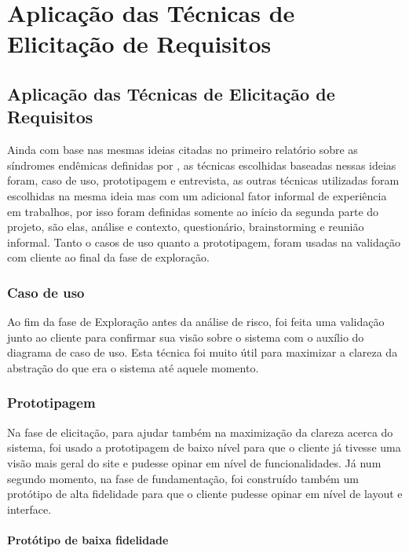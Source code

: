 \part{Aplicação das Técnicas de Elicitação de Requisitos}
\chapter[Aplicação das Técnicas de Elicitação de Requisitos]{Aplicação das Técnicas de Elicitação de Requisitos} \label{sec:tec}


Ainda com base nas mesmas ideias citadas no primeiro relatório sobre as síndromes endêmicas definidas por \cite{leffingwell2000managing}, as técnicas escolhidas baseadas nessas ideias foram, caso de uso, prototipagem e entrevista, as outras técnicas utilizadas foram escolhidas na mesma ideia mas com um adicional fator informal de experiência em trabalhos, por isso foram definidas somente ao início da segunda parte do projeto, são elas, análise e contexto, questionário, brainstorming e reunião informal.
Tanto o casos de uso quanto a prototipagem, foram usadas na validação com cliente ao final da fase de exploração. 

\section{Caso de uso}

Ao fim da fase de Exploração antes da análise de risco, foi feita uma validação junto ao cliente para confirmar sua visão sobre o sistema com o auxílio do diagrama de caso de uso. Esta técnica foi muito útil para maximizar a clareza da abstração do que era o sistema até aquele momento.

\section{Prototipagem}

Na fase de elicitação, para ajudar também na maximização da clareza acerca do sistema, foi usado a prototipagem de baixo nível para que o cliente já tivesse uma visão mais geral do site e pudesse opinar em nível de funcionalidades. Já num segundo momento, na fase de fundamentação, foi construído também um protótipo de alta fidelidade para que o cliente pudesse opinar em nível de layout e interface.

\subsection{Protótipo de baixa fidelidade}

